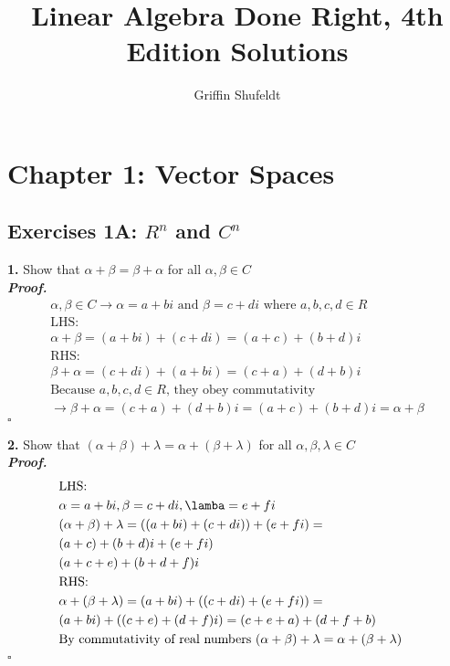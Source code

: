 \documentclass[12pt]{article} %
\newenvironment{solution}[1][\it{Proof}]{\textbf{#1. } }{$\square$}
\begin{document}

\title{Linear Algebra Done Right, 4th Edition Solutions}

\author{Griffin Shufeldt}
\date{ }

\maketitle                        %
\newpage

\section*{Chapter 1: Vector Spaces}
\subsection*{Exercises 1A: $R^n$ and $C^n$}
\textbf{1.} Show that $\alpha + \beta = \beta + \alpha$ for all $\alpha,\beta \in C$ \\

\begin{solution}
\begin{align*}
    & \alpha, \beta \in C \rightarrow \alpha = a + bi \text{ and } \beta = c + di \text{ where } a,b,c,d \in R & \\
    & \text{LHS: } & \\
    & \alpha + \beta = (a + bi) + (c + di) = (a+c) + (b+d)i & \\
    & \text{RHS: } & \\
    & \beta + \alpha = (c+di) + (a+bi) = (c+a) + (d+b)i & \\
    & \text{Because $a,b,c,d \in R$, they obey commutativity} & \\
    & \rightarrow \beta + \alpha = (c+a) + (d+b)i = (a+c) + (b+d)i = \alpha + \beta
\end{align*}
\end{solution}

\textbf{2.} Show that $(\alpha + \beta) + \lambda = \alpha + (\beta + \lambda)$ for all $\alpha,\beta,\lambda \in C$ \\

\begin{solution}
\begin{align*}
    &\text{LHS: } & \\
    &\alpha = a+bi, \beta = c+di, \lamba = e+fi &\\
    &(\alpha + \beta) + \lambda = ((a+bi)+(c+di))+(e+fi) = & \\
    &(a+c)+(b+d)i + (e+fi) & \\
    &(a+c+e)+(b+d+f)i  & \\
    & \text{RHS: } & \\
    &\alpha + (\beta + \lambda) = (a + bi) + ((c+di)+(e+fi)) = & \\
    &(a+bi) + ((c+e) + (d+f)i) = (c+e+a) + (d+f+b) & \\
    &\text{By commutativity of real numbers } (\alpha + \beta) + \lambda = \alpha + (\beta + \lambda) 
\end{align*}
\end{solution}
\end{document}

